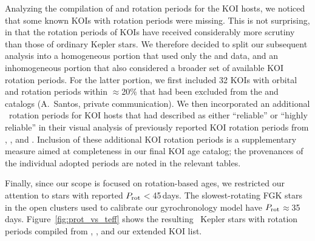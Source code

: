 \documentclass[11pt,twocolumn,tighten]{aastex63}
\begin{document}
Analyzing the compilation of  and
 rotation periods for the KOI hosts, we
noticed that some known KOIs with rotation periods were missing.  This
is not surprising, in that the rotation periods of KOIs have received
considerably more scrutiny than those of ordinary Kepler stars.  We
therefore decided to split our subsequent analysis into a homogeneous
portion that used only the  and
 data, and an inhomogeneous portion that also
considered a broader set of available KOI rotation periods.  For the
latter portion, we first included 32 KOIs with orbital and rotation
periods within $\approx$20\% that had been
excluded %
from the  and 
catalogs (A.~Santos, private communication).  We then incorporated an
additional \nnewdavidtwentyone\ rotation periods for KOI hosts that
\citet{David_2021} had described as either ``reliable'' or ``highly
reliable'' in their visual analysis of previously reported KOI
rotation periods from \citet{McQuillan_2013}, \citet{Walkowicz_2013}, \citet{Mazeh_2015}
and \citet{Angus_2018}.  Inclusion of these additional KOI rotation
periods is a supplementary measure aimed at completeness in our final
KOI age catalog; the provenances of the individual adopted periods are
noted in the relevant tables.

Finally, since our scope is focused on rotation-based ages, we
restricted our attention to stars with reported $P_{\rm
rot}$$<$45\,days.  The slowest-rotating FGK
stars in the open clusters used to
calibrate our gyrochronology model have $P_{\rm rot}$$\approx$35\,days.
Figure~\ref{fig:prot_vs_teff}
shows the resulting \nuniqstarsantosrot\ Kepler stars with rotation
periods compiled from ,
, and our extended KOI list.
\end{document}
